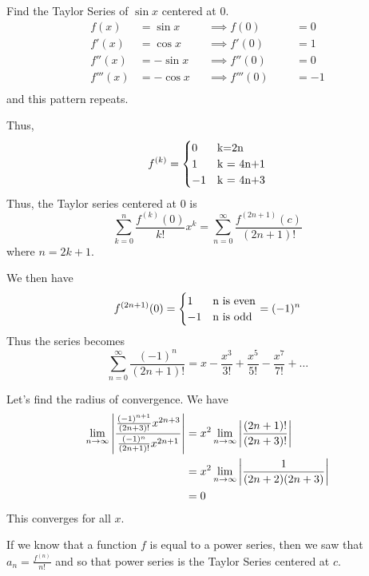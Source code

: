\documentclass{article}
\begin{document}
        \begin{example}
          Find the Taylor Series of $\sin x$ centered at $0$.
          \begin{align*}
            f(x) &= \sin x &&\implies f(0) &&&= 0\\
            f'(x) &= \cos x &&\implies f'(0) &&&= 1\\
            f''(x) &= -\sin x &&\implies f''(0) &&&= 0\\
            f'''(x) &= -\cos x &&\implies f'''(0) &&&= -1\\
          \end{align*}
          and this pattern repeats.

          Thus, \[
            f^{(k)} =
            \begin{cases}
              0 & $k=2n$\\
              1 & $k = 4n+1$\\
              -1 & $k = 4n+3$\\
            \end{cases}
          \]
          Thus, the Taylor series centered at $0$ is \[
            \sum_{k=0}^n \frac{f^{(k)}(0)}{k!} x^k = \sum_{n=0}^\infty \frac{f^{(2n+1)}(c)}{(2n+1)!}
          \] where $n = 2k+1$.

          We then have \[
            f^{(2n+1)}(0) =
            \begin{cases}
              1 & $n$ \text{ is even}\\
              -1 & $n$ \text{ is odd}\\
            \end{cases} = (-1)^n
          \]
          Thus the series becomes \[
            \sum_{n=0}^\infty \frac{(-1)^n}{(2n+1)!} = x - \frac{x^3}{3!} + \frac{x^5}{5!} - \frac{x^7}{7!} + \dots
          \]

          Let's find the radius of convergence. We have
          \begin{align*}
            \lim_{n\to\infty} \abs{\frac{\frac{(-1)^{n+1}}{(2n+3)!}x^{2n+3}}{\frac{(-1)^n}{(2n+1)!}x^{2n+1}}} &= x^2\lim_{n\to\infty}\abs{\frac{(2n+1)!}{(2n+3)!}}\\
            &= x^2 \lim_{n\to\infty} \abs{\frac{1}{(2n+2)(2n+3)}}\\
            &= 0\\
          \end{align*}
          This converges for all $x$.
        \end{example}
        \begin{remark}
          If we know that a function $f$ is equal to a power series, then we saw that $a_n = \frac{f^{(n)}}{n!}$ and so that power series is the Taylor Series centered at $c$.
        \end{remark}
\end{document}
